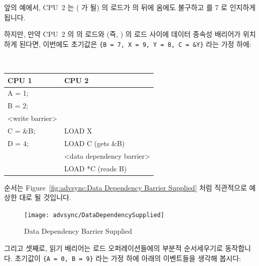 \begin{enumerate}
앞의 예에서, CPU~2 는 ( 가 될)  의 로드가  의 
뒤에 옴에도 불구하고  를 7 로 인지하게 됩니다.

하지만, 만약 CPU~2 의  의 로드와  (즉, ) 의 로드 사이에
데이터 종속성 배리어가 위치하게 된다면, 이번에도 초기값은
{\tt \{B = 7, X = 9, Y = 8, C = \&Y\}} 라는 가정 하에:

\vspace{5pt}
\begin{minipage}[t]{\columnwidth}
\tt
\scriptsize
\begin{tabular}{l|p{1.5in}}
	CPU 1 &		CPU 2 \\
	\hline
	A = 1; & \\
	B = 2; & \\
	<write barrier> & \\
	C = \&B; & 	LOAD X\\
	D = 4;	&	LOAD C (gets \&B) \\
		&	<data dependency barrier> \\
		&	LOAD *C (reads B) \\
\end{tabular}
\end{minipage}
\vspace{5pt}

순서는 Figure~\ref{fig:advsync:Data Dependency Barrier Supplied} 처럼
직관적으로 예상한 대로 될 것입니다.

\begin{figure}[htb]
\begin{center}
\texttt{[image: advsync/DataDependencySupplied]}
\end{center}
\caption{Data Dependency Barrier Supplied}
\end{figure}

그리고 셋째로, 읽기 배리어는 로드 오퍼레이션들에의 부분적 순서세우기로
동작합니다.
초기값이 {\tt \{A = 0, B = 9\}} 라는 가정 하에 아래의 이벤트들을 생각해 봅시다:
\iffalse


\end{enumerate}
